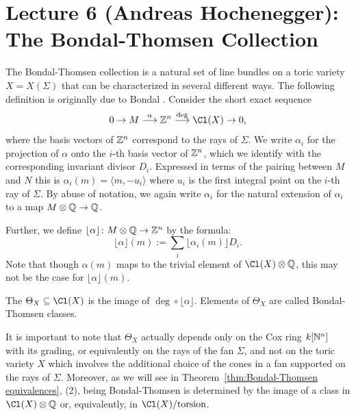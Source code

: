 \documentclass{amsart}
\begin{document}
\fi


\def\alp{{ \lfloor \alpha \rfloor}}

\section{Lecture 6 (Andreas Hochenegger): The Bondal-Thomsen Collection}\label{lec:6-bondal-thomsen}

The Bondal-Thomsen collection is a natural set of line bundles on a toric variety $X = X(\Sigma)$ that can be characterized in several different ways.  The following definition is originally due to Bondal \cite{Bondal06}.  Consider the short exact sequence
\begin{equation}\label{eqn:SESCl}
0\to M\overset{\alpha}{\longrightarrow} \ZZ^n \overset{\deg}{\longrightarrow} \Cl(X) \to 0,
\end{equation}
where the basis vectors of $\mathbb Z^{n}$ correspond to the rays of $\Sigma$. We write $\alpha_i$ for the projection of $\alpha$ onto the $i$-th basis vector of $\mathbb Z^{n}$, which we identify with the corresponding invariant divisor $D_{i}$. Expressed in terms of the pairing between $M$ and $N$ this is $\alpha_i(m) = \langle m, -u_i\rangle$ where $u_{i}$
is the first integral point on the $i$-th ray of $\Sigma$. By abuse of notation, we again write $\alpha_{i}$ for the natural extension of $\alpha_{i}$ to a map
$M\otimes \mathbb Q\to \mathbb Q$.

Further, 
we define $\lfloor \alpha \rfloor\colon M\otimes \mathbb Q \to \mathbb Z^n$ by the formula:
\[
  \lfloor \alpha \rfloor(m) :=  \sum_{i} \lfloor \alpha_i(m) \rfloor D_i.
\]
Note that though $\alpha(m)$ maps to the trivial element of $\Cl(X)\otimes \QQ$, this may not be the case for $\lfloor \alpha \rfloor(m)$.

\begin{defn}\label{defn:BTcollection}
    The  $\Theta_X\subseteq \Cl(X)$ is the image of $\deg \circ \lfloor \alpha \rfloor$.
    Elements of $\Theta_{X}$ are called Bondal-Thomsen  classes.
 \end{defn}
 
It is important to note that $\Theta_{X}$ actually depends only on the  Cox ring $k[\mathbb N^{n}]$ with its grading, or equivalently on the rays of the fan $\Sigma$, and 
not on the toric variety $X$ which involves the additional choice of the cones in a fan supported on the rays of $\Sigma$. Moreover, as we will see in Theorem~\ref{thm:Bondal-Thomsen equivalences}, (2), being Bondal-Thomsen is determined by the image of a class in $\Cl(X) \otimes \QQ$ or, equivalently, in $\Cl(X)/\hbox{torsion}$.
\end{document}
